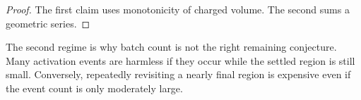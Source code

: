 \begin{proof}
The first claim uses monotonicity of charged volume.  The second sums a
geometric series.
\end{proof}

The second regime is why batch count is not the right remaining conjecture.
Many activation events are harmless if they occur while the settled region is
still small.  Conversely, repeatedly revisiting a nearly final region is
expensive even if the event count is only moderately large.
